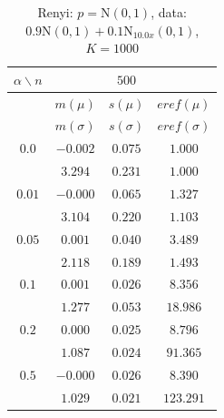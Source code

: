 \documentclass[11pt,a4paper]{beamer}
\newcommand{\amtiT}{\arg \max_{\theta \in \Theta}}
\begin{document}
\begin{frame}
\begin{table}[ht] \footnotesize 
\begin{center} 
\begin{tabular}{|c|ccc|} 
\hline 
$\alpha\backslash n$ &&  $500$ & \\ 
\hline 
& $m(\mu)$ & $s(\mu)$ & $eref(\mu)$ \\ 
& $m(\sigma)$ & $s(\sigma)$ & $eref(\sigma)$ \\ 
\hline 
$0.0$ & $ -0.002 $ & $ 0.075 $ & $ 1.000 $\\ 
 &  $ 3.294 $ & $ 0.231 $ & $ 1.000 $\\ 
\hline 
$0.01$& $ -0.000 $ & $ 0.065 $ & $ 1.327 $\\ 
 & $ 3.104 $ & $ 0.220 $ & $ 1.103 $\\ 
\hline 
$0.05$ & $ 0.001 $ & $ 0.040 $ & $ 3.489 $\\ 
 &  $ 2.118 $ & $ 0.189 $ & $ 1.493 $\\ 
\hline 
$0.1$ &  $ 0.001 $ & $ 0.026 $ & $ 8.356 $\\ 
 & $ 1.277 $ & $ 0.053 $ & $ 18.986 $\\ 
\hline 
$0.2$ &  $ 0.000 $ & $ 0.025 $ & $ 8.796 $\\ 
 & $ 1.087 $ & $ 0.024 $ & $ 91.365 $\\ 
\hline 
$0.5$ &$ -0.000 $ & $ 0.026 $ & $ 8.390 $\\ 
 & $ 1.029 $ & $ 0.021 $ & $ 123.291 $\\ 
\hline 
\end{tabular}
\caption{Renyi: $p = \mathrm{N}(0,1)$, data: $0.9\mathrm{N}(0,1) + 0.1\mathrm{N}_{10.0x}(0,1)$, $K = 1000$} 
\end{center}
\end{table}
\end{frame}

\end{document}
